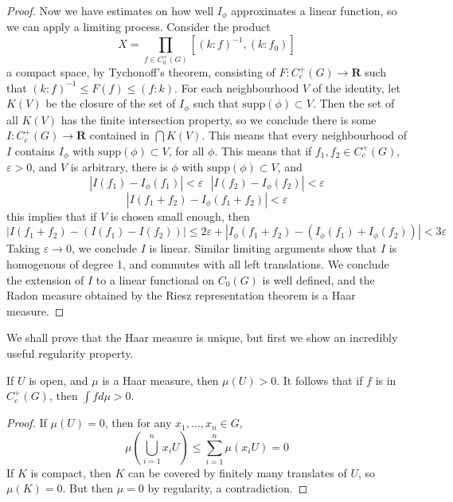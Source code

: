 \begin{proof}
    Now we have estimates on how well $I_\phi$ approximates a linear function, so we can apply a limiting process. Consider the product
    \[ X = \prod_{f \in C^+_0(G)} [(k : f)^{-1}, (k: f_0)] \]
    a compact space, by Tychonoff's theorem, consisting of $F: C_c^+(G) \to \mathbf{R}$ such that $(k : f)^{-1} \leq F(f) \leq (f: k)$. For each neighbourhood $V$ of the identity, let $K(V)$ be the closure of the set of $I_\phi$ such that $\text{supp}(\phi) \subset V$. Then the set of all $K(V)$ has the finite intersection property, so we conclude there is some $I: C_c^+(G) \to \mathbf{R}$ contained in $\bigcap K(V)$. This means that every neighbourhood of $I$ contains $I_\phi$ with $\text{supp}(\phi) \subset V$, for all $\phi$. This means that if $f_1, f_2 \in C_c^+(G)$, $\varepsilon > 0$, and $V$ is arbitrary, there is $\phi$ with $\text{supp}(\phi) \subset V$, and
    \[ |I(f_1) - I_\phi(f_1)| < \varepsilon\ \ \ |I(f_2) - I_\phi(f_2)| < \varepsilon \]
    \[ |I(f_1 + f_2) - I_\phi(f_1 + f_2)| < \varepsilon \]
    this implies that if $V$ is chosen small enough, then
    \[ |I(f_1 + f_2) - (I(f_1) - I(f_2))| \leq 2 \varepsilon + |I_\phi(f_1 + f_2) - (I_\phi(f_1) + I_\phi(f_2))| < 3 \varepsilon \]
    Taking $\varepsilon \to 0$, we conclude $I$ is linear. Similar limiting arguments show that $I$ is homogenous of degree 1, and commutes with all left translations. We conclude the extension of $I$ to a linear functional on $C_0(G)$ is well defined, and the Radon measure obtained by the Riesz representation theorem is a Haar measure.
\end{proof}

We shall prove that the Haar measure is unique, but first we show an incredibly useful regularity property.

\begin{prop}
    If $U$ is open, and $\mu$ is a Haar measure, then $\mu(U) > 0$. It follows that if $f$ is in $C_c^+(G)$, then $\int f d \mu > 0$.
\end{prop}
\begin{proof}
    If $\mu(U) = 0$, then for any $x_1, \dots, x_n \in G$,
    \[ \mu \left( \bigcup_{i = 1}^n x_i U \right) \leq \sum_{i = 1}^n \mu(x_i U) = 0 \]
    If $K$ is compact, then $K$ can be covered by finitely many translates of $U$, so $\mu(K) = 0$. But then $\mu = 0$ by regularity, a contradiction.
\end{proof}

